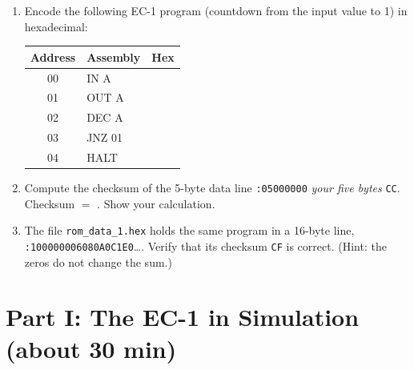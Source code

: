 \documentclass{article}
\begin{document}
\begin{enumerate}
    \item Encode the following EC-1 program (countdown from the input value to 1) in hexadecimal:
    \begin{center}
    \begin{tabular}{|c|l|c|}
        \hline
        \textbf{Address} & \textbf{Assembly} & \textbf{Hex} \\
        \hline
        00 & IN A & \\ \hline
        01 & OUT A & \\ \hline
        02 & DEC A & \\ \hline
        03 & JNZ 01 & \\ \hline
        04 & HALT & \\ \hline
    \end{tabular}
    \end{center}
    \item Compute the checksum of the 5-byte data line \texttt{:05000000} \textit{your five bytes} \texttt{CC}. Checksum $= $ \underline{\hspace{2cm}}. Show your calculation.
    \item The file \texttt{rom\_data\_1.hex} holds the same program in a 16-byte line, \texttt{:100000006080A0C1E0}\ldots. Verify that its checksum \texttt{CF} is correct. (Hint: the zeros do not change the sum.)
\end{enumerate}

\section*{Part I: The EC-1 in Simulation (about 30 min)}
\end{document}
